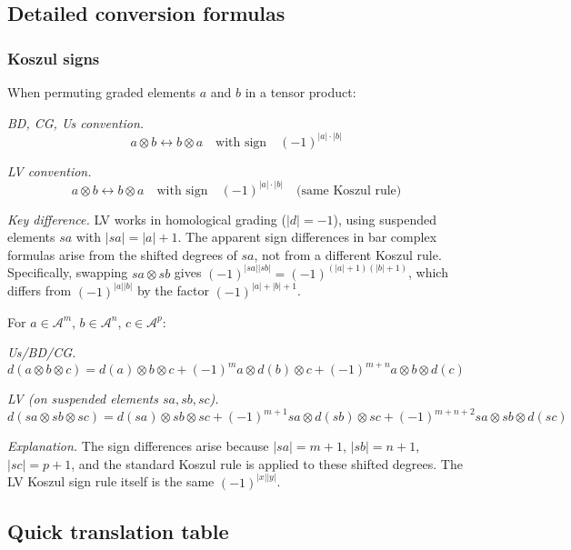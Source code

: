 \subsection{Detailed conversion formulas}

\subsubsection{Koszul signs}

\begin{definition}
When permuting graded elements $a$ and $b$ in a tensor product:

\emph{BD, CG, Us convention.}
\[a \otimes b \leftrightarrow b \otimes a \quad \text{with sign} \quad (-1)^{|a| \cdot |b|}\]

\emph{LV convention.}
\[a \otimes b \leftrightarrow b \otimes a \quad \text{with sign} \quad (-1)^{|a| \cdot |b|} \quad \text{(same Koszul rule)}\]

\emph{Key difference.}
LV works in homological grading ($|d| = -1$), using suspended elements $sa$ with $|sa| = |a| + 1$. The apparent sign differences in bar complex formulas arise from the shifted degrees of $sa$, not from a different Koszul rule. Specifically, swapping $sa \otimes sb$ gives $(-1)^{|sa||sb|} = (-1)^{(|a|+1)(|b|+1)}$, which differs from $(-1)^{|a||b|}$ by the factor $(-1)^{|a|+|b|+1}$.
\end{definition}

\begin{example}
For $a \in \mathcal{A}^m$, $b \in \mathcal{A}^n$, $c \in \mathcal{A}^p$:

\emph{Us/BD/CG.}
\[d(a \otimes b \otimes c) = d(a) \otimes b \otimes c + (-1)^m a \otimes d(b) \otimes c 
+ (-1)^{m+n} a \otimes b \otimes d(c)\]

\emph{LV (on suspended elements $sa, sb, sc$).}
\[d(sa \otimes sb \otimes sc) = d(sa) \otimes sb \otimes sc + (-1)^{m+1} sa \otimes d(sb) \otimes sc
+ (-1)^{m+n+2} sa \otimes sb \otimes d(sc)\]

\emph{Explanation.} The sign differences arise because $|sa| = m+1$, $|sb| = n+1$, $|sc| = p+1$, and the standard Koszul rule is applied to these shifted degrees. The LV Koszul sign rule itself is the same $(-1)^{|x||y|}$.
\end{example}

\subsection{Quick translation table}


